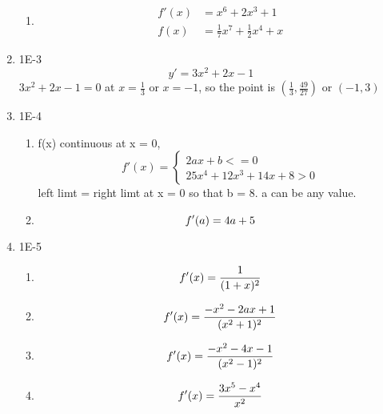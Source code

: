 \documentclass{article}
\begin{document}
\begin{enumerate}
\begin{enumerate}
    \item 
    \begin{align*}
        f'(x) &= x^6 + 2x^3 + 1 \\
        f(x) &= \frac{1}{7}x^7 + \frac{1}{2}x^4 + x
    \end{align*}
    \end{enumerate}
\item 1E-3
    \begin{equation*}
        y' = 3x^2 + 2x - 1
    \end{equation*}
    $3x^2 + 2x - 1 = 0$ at $x = \frac{1}{3}$ or $x = -1$,
    so the point is $(\frac{1}{3}, \frac{49}{27})$ or $(-1, 3)$
\item 1E-4
    \begin{enumerate}
        \item f(x) continuous at x = 0, 
        \begin{equation*}
            f'(x) = 
            \begin{cases}
                2ax + b <= 0 \\
                25x^4 + 12x^3 + 14x + 8 > 0
            \end{cases}
        \end{equation*}
        left limt = right limt at x = 0 so that b = 8. a can be any value.
        \item 
        \begin{equation*}
            f'(a) = 4a+5 \\
        \end{equation*}
    \end{enumerate}
\item 1E-5
    \begin{enumerate}
        \item 
            \begin{equation*}
                f'(x) = \frac{1}{(1+x)^2} \\
            \end{equation*}
        \item 
            \begin{equation*}
                f'(x) = \frac{-x^2 - 2ax + 1}{(x^2+1)^2} \\
            \end{equation*}
        \item 
            \begin{equation*}
                f'(x) = \frac{-x^2 -4x - 1}{(x^2-1)^2} \\
            \end{equation*}
        \item 
            \begin{equation*}
                f'(x) = \frac{3x^5 - x^4}{x^2} \\
            \end{equation*}            
    \end{enumerate}
\end{enumerate}
\end{document}
